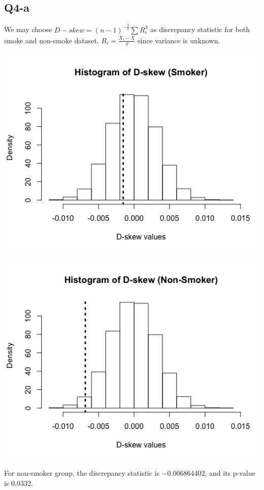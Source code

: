 \documentclass[11pt,letterpaper]{article}
\begin{document}
\subsection*{Q4-a}
\noindent We may choose $D-skew = (n - 1)^{-\frac{3}{2}} \sum R_i^3$ as discrepancy statistic for both smoke and non-smoke dataset. $R_i = \frac{X_i - \bar{X}}{S}$ since variance is unknown.

\includegraphics[scale=0.5]{q4-a-smoke.png}

\includegraphics[scale=0.5]{q4-a-nonsmoke.png}

\noindent For non-smoker group, the discrepancy statistic is $-0.006864402$, and its p-value is $0.0332$. 
\end{document}
